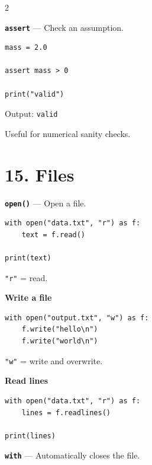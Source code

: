 \documentclass[10pt,a4paper]{article}
\begin{document}
\begin{multicols}{2}
\begin{card}
\textbf{\texttt{assert}} --- Check an assumption.

\begin{lstlisting}[style=pythonstyle]
mass = 2.0

assert mass > 0

print("valid")
\end{lstlisting}

Output:
\texttt{valid}

Useful for numerical sanity checks.
\end{card}

\section*{15. Files}

\begin{card}
\textbf{\texttt{open()}} --- Open a file.

\begin{lstlisting}[style=pythonstyle]
with open("data.txt", "r") as f:
    text = f.read()

print(text)
\end{lstlisting}

\texttt{"r"} = read.
\end{card}

\begin{card}
\textbf{Write a file}

\begin{lstlisting}[style=pythonstyle]
with open("output.txt", "w") as f:
    f.write("hello\n")
    f.write("world\n")
\end{lstlisting}

\texttt{"w"} = write and overwrite.
\end{card}

\begin{card}
\textbf{Read lines}

\begin{lstlisting}[style=pythonstyle]
with open("data.txt", "r") as f:
    lines = f.readlines()

print(lines)
\end{lstlisting}
\end{card}

\begin{card}
\textbf{\texttt{with}} --- Automatically closes the file.


\end{card}
\end{multicols}
\end{document}
